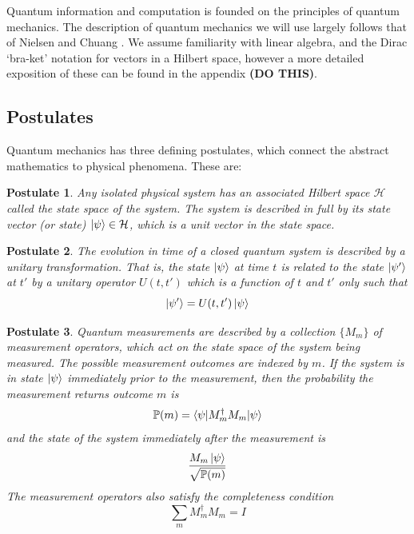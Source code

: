 \documentclass[12pt,a4paper]{report}
\begin{document}
Quantum information and computation is founded on the principles of quantum mechanics. The description of quantum mechanics we will use largely follows that of Nielsen and Chuang \cite{NielsenChuang}. We assume familiarity with linear algebra, and the Dirac `bra-ket' notation for vectors in a Hilbert space, however a more detailed exposition of these can be found in the appendix \textbf{(DO THIS)}.

\subsection{Postulates}\label{posts}

Quantum mechanics has three defining postulates, which connect the abstract mathematics to physical phenomena. These are:

\newtheorem{postulate}{Postulate}

\begin{postulate}
	Any isolated physical system has an associated Hilbert space $\mathcal{H}$ called the \textit{state space} of the system. The system is described in full by its \textit{state vector} (or state) $\ket{\psi}\in\mathcal{H}$, which is a unit vector in the state space.
\end{postulate}

\begin{postulate}
	The evolution in time of a closed quantum system is described by a unitary transformation. That is, the state $\ket{\psi}$ at time $t$ is related to the state $\ket{\psi'}$ at $t'$ by a unitary operator $U(t,t')$ which is a function of $t$ and $t'$ only such that
	\begin{equation}
		\ket{\psi'}=U(t,t')\ket{\psi}
	\end{equation}
\end{postulate}

\begin{postulate}
	Quantum measurements are described by a collection $\{M_{m}\}$ of measurement operators, which act on the state space of the system being measured. The possible measurement outcomes are indexed by $m$. If the system is in state $\ket{\psi}$ immediately prior to the measurement, then the probability the measurement returns outcome $m$ is
	\begin{equation} \label{mmtprob}
		\mathbb{P}(m)=\braket{\psi|M_{m}^{\dagger}M_{m}|\psi}
	\end{equation}
	and the state of the system immediately after the measurement is
	\begin{equation}\label{mmtcol}
		\frac{M_{m}\ket{\psi}}{\sqrt{\mathbb{P}(m)}}
	\end{equation}
	The measurement operators also satisfy the completeness condition
	\begin{equation}
		\sum_{m}M_{m}^{\dagger}M_{m}=I
	\end{equation}
\end{postulate}
\end{document}
